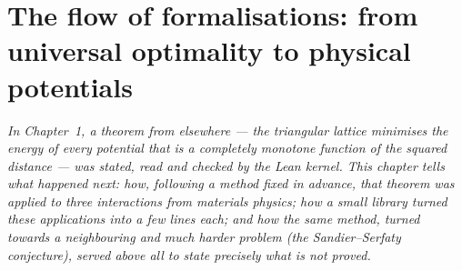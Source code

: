 

\chapter{The flow of formalisations: from universal optimality to physical potentials}\label{ch2:chapitre}

\begin{center}
\begin{minipage}{0.9\linewidth}\small\itshape
In Chapter~1, a theorem from elsewhere --- the triangular lattice minimises the energy of every potential that is a
completely monotone function of the squared distance --- was stated, read and checked by the Lean kernel. This chapter
tells what happened next: how, following a method fixed in advance, that theorem was applied to three interactions from
materials physics; how a small library turned these applications into a few lines each; and how the same method, turned
towards a neighbouring and much harder problem (the Sandier--Serfaty conjecture), served above all to state precisely
what is \emph{not} proved.
\end{minipage}
\end{center}

